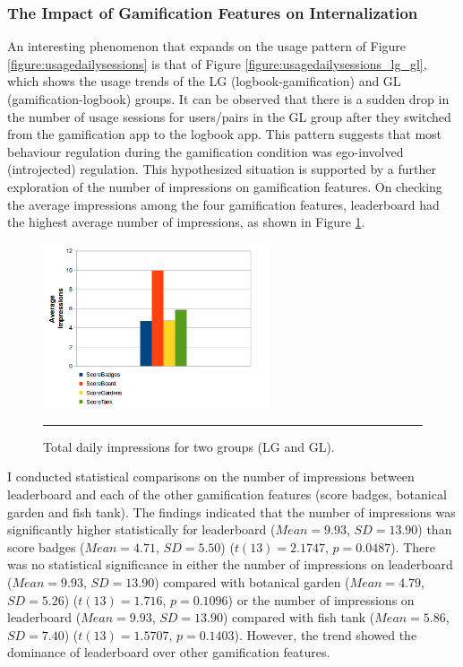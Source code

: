 \subsubsection*{The Impact of Gamification Features on Internalization}
An interesting phenomenon that expands on the usage pattern of Figure \ref{figure:usagedailysessions} is that of Figure \ref{figure:usagedailysessions_lg_gl}, which shows the usage trends of the LG (logbook-gamification) and GL (gamification-logbook) groups. It can be observed that there is a sudden drop in the number of usage sessions for users/pairs in the GL group after they switched from the gamification app to the logbook app. This pattern suggests that most behaviour regulation during the gamification condition was ego-involved (introjected) regulation. This hypothesized situation is supported by a further exploration of the number of impressions on gamification features. On checking the average impressions among the four gamification features, leaderboard had the highest average number of impressions, as shown in Figure \ref{figure:gamification_impressions_latest_all}. 
\begin{figure}[htbp]
  \centering
    \includegraphics[width=0.6\textwidth]{Figures/gamification_impressions_latest_all.png}
    \rule{35em}{0.5pt}
  \caption{Total daily impressions for two groups (LG and GL).}
  \label{figure:gamification_impressions_latest_all}
\end{figure}
I conducted statistical comparisons on the number of impressions between leaderboard and each of the other gamification features (score badges, botanical garden and fish tank). The findings indicated that the number of impressions was significantly higher statistically for leaderboard ($Mean=9.93$, $SD=13.90$) than score badges ($Mean=4.71$, $SD = 5.50$) ($t (13) =2.1747$, $p=0.0487$). There was no statistical significance in either the number of impressions on leaderboard ($Mean=9.93$, $SD=13.90$) compared with botanical garden ($Mean = 4.79$, $SD = 5.26$) ($t(13)=1.716$, $p= 0.1096$) or the number of impressions on leaderboard ($Mean= 9.93$, $SD = 13.90$) compared with fish tank ($Mean=5.86$, $SD=7.40$) ($t(13)=1.5707$, $p = 0.1403$). However, the trend showed the dominance of leaderboard over other gamification features. 

